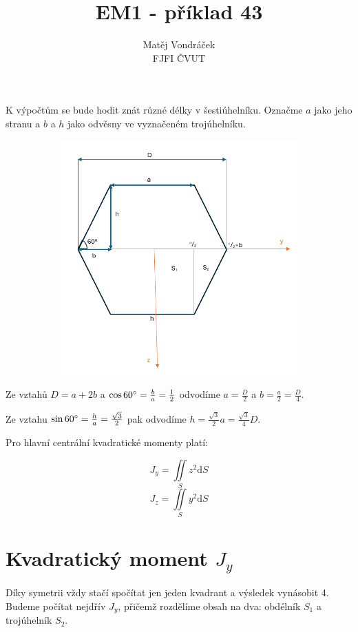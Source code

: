 \documentclass{article}
\title{EM1 - příklad 43}
\author{Matěj Vondráček \\ FJFI ČVUT}
\begin{document}
\maketitle

K výpočtům se bude hodit znát různé délky v šestiúhelníku. Označme $a$ jako jeho stranu a $b$ a $h$ jako odvěsny ve vyznačeném trojúhelníku. 

\begin{figure}[h]    
    \begin{subfigure}[b]{0.7\textwidth}
        \includegraphics[width=\textwidth]{pic.png}
    \end{subfigure}
\end{figure}

Ze vztahů $D=a+2b$ a $\cos{60\degree}=\frac{b}{a}=\frac{1}{2}$ odvodíme $a=\frac{D}{2}$ a $b=\frac{a}{2} = \frac{D}{4}$.

Ze vztahu $\sin{60\degree}=\frac{h}{a}=\frac{\sqrt{3}}{2}$ pak odvodíme $h=\frac{\sqrt{3}}{2}a = \frac{\sqrt{3}}{4} D$.

\bigskip

Pro hlavní centrální kvadratické momenty platí:

\[ J_y=\iint\limits_{S} z^2\mathrm{d}S \] 
\[ J_z=\iint\limits_{S} y^2\mathrm{d}S \] 

\section{Kvadratický moment $J_y$}
Díky symetrii vždy stačí spočítat jen jeden kvadrant a výsledek vynásobit 4. Budeme počítat nejdřív $J_y$, přičemž rozdělíme obsah na dva: obdélník $S_1$ a trojúhelník $S_2$.
\end{document}
